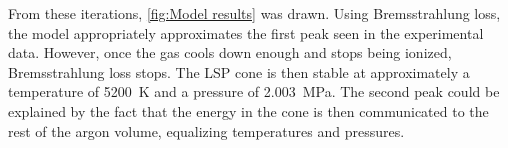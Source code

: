          From these iterations, \autoref{fig:Model results} was drawn. Using Bremsstrahlung loss, the model appropriately approximates the first peak seen in the experimental data. However, once the gas cools down enough and stops being ionized, Bremsstrahlung loss stops. The LSP cone is then stable at approximately a temperature of \qty{5200}{K} and a pressure of \qty{2.003}{MPa}. The second peak could be explained by the fact that the energy in the cone is then communicated to the rest of the argon volume, equalizing temperatures and pressures.